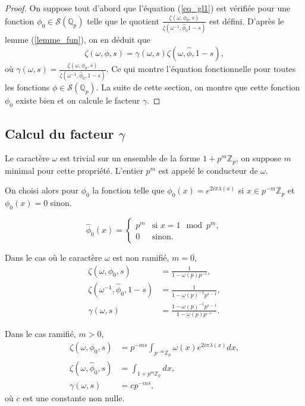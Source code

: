 \begin{proof}
On suppose tout d'abord que l'équation (\ref{eq_gl1}) est vérifiée pour une fonction $\phi_0 \in \mathcal{S}(\mathbb{Q}_p)$ telle que le quotient $\frac{\zeta(\omega, \phi_0, s)}{\zeta(\omega^{-1}, \hat{\phi}_0 1-s)}$ est défini. D'après le lemme (\ref{lemme_fun}), on en déduit que
\begin{equation}
\zeta(\omega, \phi, s) = \gamma(\omega,s)\zeta(\omega, \hat{\phi}, 1-s),
\end{equation}
où $\gamma(\omega,s) = \frac{\zeta(\omega, \phi_0, s)}{\zeta(\omega^{-1}, \hat{\phi}_0, 1-s)}$. Ce qui montre l'équation fonctionnelle pour toutes les fonctions $\phi \in \mathcal{S}(\mathbb{Q}_p)$. La suite de cette section, on montre que cette fonction $\phi_0$ existe bien et on calcule le facteur $\gamma$.
\end{proof}

\subsection{Calcul du facteur $\gamma$}

Le caractère $\omega$ est trivial sur un ensemble de la forme $1+p^m \mathbb{Z}_p$, on suppose $m$ minimal pour cette propriété. L'entier $p^m$ est appelé le conducteur de $\omega$.

On choisi alors pour $\phi_0$ la fonction telle que $\phi_0(x)=e^{2i\pi \lambda(x)}$ si $x \in p^{-m}\mathbb{Z}_p$ et $\phi_0(x)=0$ sinon.

\begin{lemme}
\begin{equation}
\hat{\phi}_0(x) = \left\{
    \begin{array}{ll}
        p^m & \mbox{si } x = 1 \mod p^m, \\
        0 & \mbox{sinon.}
    \end{array}
\right.
\end{equation}
\end{lemme}

Dans le cas où le caractère $\omega$ est non ramifié, $m=0$,
\begin{align}
\zeta(\omega, \phi_0, s)&=\frac{1}{1-\omega(p)p^{-s}},\\
\zeta(\omega^{-1}, \hat{\phi}_0, 1-s) &= \frac{1}{1-\omega(p)^{-1}p^{s-1}}, \\
\gamma(\omega,s) &= \frac{1-\omega(p)^{-1}p^{s-1}}{1-\omega(p)p^{-s}}.
\end{align}

Dans le cas ramifié, $m > 0$,
\begin{align}
\zeta(\omega, \phi_0, s) &= p^{-ms}\int_{p^{-m}\mathbb{Z}_p} \omega(x)e^{2i\pi \lambda(x)}dx, \\
\zeta(\omega, \hat{\phi}_0, s) &= \int_{1+p^{m}\mathbb{Z}_p} dx, \\
\gamma(\omega,s) &= c p^{-ms},
\end{align}
où $c$ est une constante non nulle.

